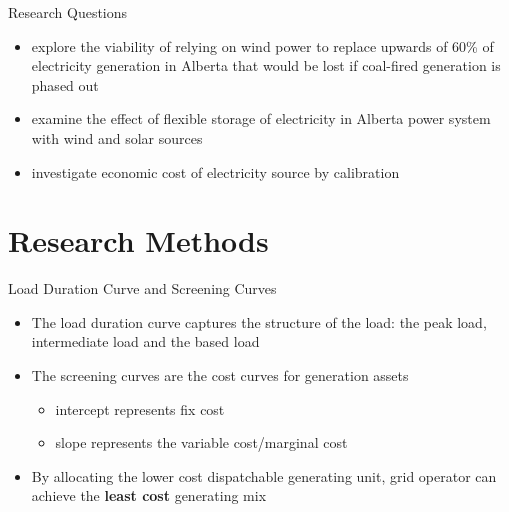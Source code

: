 \documentclass[newPxFont,numfooter,progressbar,sectionpages]{beamer}
\begin{document}

\begin{frame}[c]{Research Questions}

\begin{itemize}
	\item explore the viability of relying on wind power to replace upwards of 60\% of electricity generation in Alberta that would be lost if coal-fired generation is phased out
	\item examine the effect of flexible storage of electricity in Alberta power system with wind and solar sources
	\item investigate economic cost of electricity source by calibration
	
\end{itemize}


\end{frame}


%
%
\section{Research Methods}





\begin{frame}[c]{Load Duration Curve and Screening Curves}

\begin{itemize}
	\item The load duration curve captures the structure of the load: the peak load, intermediate load and the based load  
	\item The screening curves are the cost curves for generation assets
	\begin{itemize}
		\item intercept represents fix cost
		\item slope represents the variable cost/marginal cost
		
	\end{itemize}
		
	\item By allocating the lower cost dispatchable generating unit, grid operator can achieve the \textbf{least cost} generating mix 
	
\end{itemize}


\end{frame}
\end{document}
